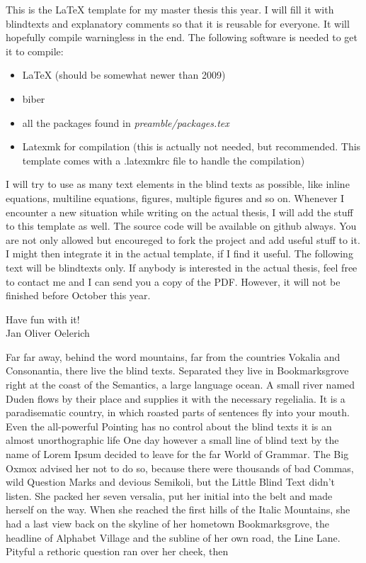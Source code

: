 \label{cha:preface}

\label{sec:introduction}

This is the \LaTeX{} template for my master thesis this year. I will fill
it with blindtexts and explanatory comments so that it is reusable for
everyone. It will hopefully compile warningless in the end. The following
software is needed to get it to compile:
\begin{itemize}
  \item LaTeX (should be somewhat newer than 2009)
  \item biber
  \item all the packages found in \emph{preamble/packages.tex}
  \item Latexmk for compilation (this is actually not needed, but
  recommended. This template comes with a .latexmkrc file to handle the
  compilation) 
\end{itemize}
I will try to use as many text elements in the blind texts as possible,
like inline equations, multiline equations, figures, multiple figures and
so on. Whenever I encounter a new situation while writing on the actual
thesis, I will add the stuff to this template as well.
The source code will be available on github always. You are not only
allowed but encoureged to fork the project and add useful stuff to it. I
might then integrate it in the actual template, if I find it useful.
The following text will be blindtexts only. If anybody is interested in the
actual thesis, feel free to contact me and I can send you a copy of the
PDF. However, it will not be finished before October this year.

\vspace{.5cm}

Have fun with it! \\
Jan Oliver Oelerich

\label{sec:ack}

Far far away, behind the word mountains, far from the countries Vokalia and
Consonantia, there live the blind texts. Separated they live in
Bookmarksgrove right at the coast of the Semantics, a large language
ocean. A small river named Duden flows by their place and supplies it with
the necessary regelialia. It is a paradisematic country, in which roasted
parts of sentences fly into your mouth. Even the all-powerful Pointing has
no control about the blind texts it is an almost unorthographic life One
day however a small line of blind text by the name of Lorem Ipsum decided
to leave for the far World of Grammar. The Big Oxmox advised her not to do
so, because there were thousands of bad Commas, wild Question Marks and
devious Semikoli, but the Little Blind Text didn't listen. She packed her
seven versalia, put her initial into the belt and made herself on the
way. When she reached the first hills of the Italic Mountains, she had a
last view back on the skyline of her hometown Bookmarksgrove, the headline
of Alphabet Village and the subline of her own road, the Line Lane. Pityful
a rethoric question ran over her cheek, then 